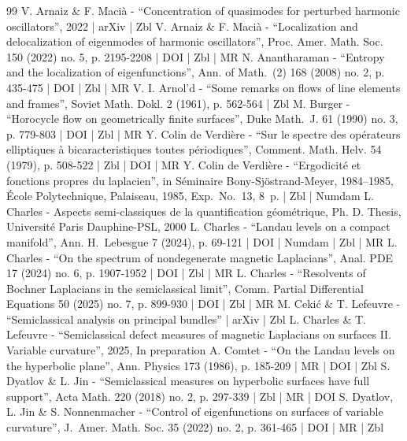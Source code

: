 \documentclass[10pt]{amsart}
\theoremstyle{plain}
\theoremstyle{definition}
\begin{document}
\begin{thebibliography}{99}
V. Arnaiz \& F. Macià - “Concentration of quasimodes for perturbed harmonic oscillators”, 2022 | arXiv | Zbl
V. Arnaiz \& F. Macià - “Localization and delocalization of eigenmodes of harmonic oscillators”, Proc. Amer. Math. Soc. 150 (2022) no. 5, p. 2195-2208 | DOI | Zbl | MR
N. Anantharaman - “Entropy and the localization of eigenfunctions”, Ann. of Math. (2) 168 (2008) no. 2, p. 435-475 | DOI | Zbl | MR
V. I. Arnol’d - “Some remarks on flows of line elements and frames”, Soviet Math. Dokl. 2 (1961), p. 562-564 | Zbl
M. Burger - “Horocycle flow on geometrically finite surfaces”, Duke Math. J. 61 (1990) no. 3, p. 779-803 | DOI | Zbl | MR
Y. Colin de Verdière - “Sur le spectre des opérateurs elliptiques à bicaracteristiques toutes périodiques”, Comment. Math. Helv. 54 (1979), p. 508-522 | Zbl | DOI | MR
Y. Colin de Verdière - “Ergodicité et fonctions propres du laplacien”, in Séminaire Bony-Sjöstrand-Meyer, 1984–1985, École Polytechnique, Palaiseau, 1985, Exp. No. 13, 8 p. | Zbl | Numdam
L. Charles - Aspects semi-classiques de la quantification géométrique, Ph. D. Thesis, Université Paris Dauphine-PSL, 2000
L. Charles - “Landau levels on a compact manifold”, Ann. H. Lebesgue 7 (2024), p. 69-121 | DOI | Numdam | Zbl | MR
L. Charles - “On the spectrum of nondegenerate magnetic Laplacians”, Anal. PDE 17 (2024) no. 6, p. 1907-1952 | DOI | Zbl | MR
L. Charles - “Resolvents of Bochner Laplacians in the semiclassical limit”, Comm. Partial Differential Equations 50 (2025) no. 7, p. 899-930 | DOI | Zbl | MR
M. Cekić \& T. Lefeuvre - “Semiclassical analysis on principal bundles” | arXiv | Zbl
L. Charles \& T. Lefeuvre - “Semiclassical defect measures of magnetic Laplacians on surfaces II. Variable curvature”, 2025, In preparation
A. Comtet - “On the Landau levels on the hyperbolic plane”, Ann. Physics 173 (1986), p. 185-209 | MR | DOI | Zbl
S. Dyatlov \& L. Jin - “Semiclassical measures on hyperbolic surfaces have full support”, Acta Math. 220 (2018) no. 2, p. 297-339 | Zbl | MR | DOI
S. Dyatlov, L. Jin \& S. Nonnenmacher - “Control of eigenfunctions on surfaces of variable curvature”, J. Amer. Math. Soc. 35 (2022) no. 2, p. 361-465 | DOI | MR | Zbl

\end{thebibliography}
\end{document}

